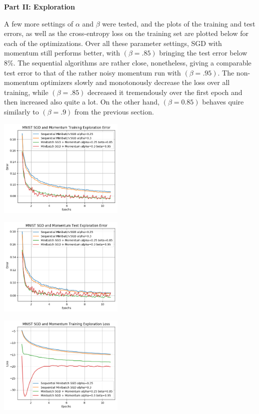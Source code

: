 \documentclass[10pt]{article}
\begin{document}
\begin{multicols}{2}
\begin{center}
\end{center}
\noindent
\textbf{Part II: Exploration} \par
A few more settings of $\alpha$ and $\beta$ were tested, and the plots of the training and test errors, as well as the cross-entropy loss on the training set are plotted below for each of the optimizations. Over all these parameter settings, SGD with momentum still performs better, with $(\beta=.85)$ bringing the test error below 8\%. The sequential algorithms are rather close, nonetheless, giving a comparable test error to that of the rather noisy momentum run with $(\beta=.95)$. The non-momentum optimizers slowly and monotonously decrease the loss over all training, while $(\beta=.85)$ decreased it tremendously over the first epoch and then increased also quite a lot. On the other hand, $(\beta=0.85)$ behaves quire similarly to $(\beta=.9)$ from the previous section.\par
\begin{center}
    \includegraphics[width=0.45\textwidth]{SGDandMomentumTrainingExplorationError.png}
\end{center}
\begin{center}
    \includegraphics[width=0.45\textwidth]{SGDandMomentumTestExplorationError.png}
\end{center}
\begin{center}
    \includegraphics[width=0.45\textwidth]{SGDandMomentumTrainingExplorationLoss.png}

\end{center}
\end{multicols}
\end{document}
